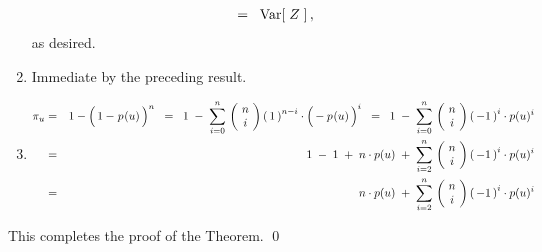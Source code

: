 \begin{enumerate}
\begin{eqnarray*}
	\;\; = \;\;
		\textnormal{Var}\!\left[\;Z\;\right],
	\end{eqnarray*}
	as desired.
\item
	Immediate by the preceding result.
\item
	\begin{eqnarray*}
	\pi_{u}
	& = &
		1 - \left(\,1 - \overset{{\color{white}-}}{p}(u)\,\right)^{n}
	\;\; = \;\;
		1 \; - \;
			\overset{n}{\underset{i=0}{\sum}}\,
			\left(\!\begin{array}{c}n \\ i\end{array}\!\right)
			\left(\,1\,\right)^{n-i}\cdot\left(\,-\,\overset{{\color{white}-}}{p}(u)\,\right)^{i}
	\;\; = \;\;
		1 \; - \;
			\overset{n}{\underset{i=0}{\sum}}\,
			\left(\!\begin{array}{c}n \\ i\end{array}\!\right)
			\left(\,-1\,\right)^{i} \cdot p(u)^{i}
	\\
	& = &
		1 \; - \; 1 \; + \; n\cdot p(u) \; + \;
			\overset{n}{\underset{i=2}{\sum}}\,
			\left(\!\begin{array}{c}n \\ i\end{array}\!\right)
			\left(\,-1\,\right)^{i} \cdot p(u)^{i}
	\\
	& = &
		n\cdot p(u) \; + \;
			\overset{n}{\underset{i=2}{\sum}}\,
			\left(\!\begin{array}{c}n \\ i\end{array}\!\right)
			\left(\,-1\,\right)^{i} \cdot p(u)^{i}
	\end{eqnarray*}
\end{enumerate}
This completes the proof of the Theorem.
\qed


\renewcommand{\theenumi}{\roman{enumi}}
\renewcommand{\labelenumi}{\textnormal{(\theenumi)}$\;\;$}

